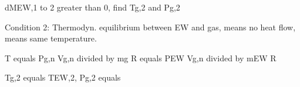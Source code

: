 dMEW,1 to 2 greater than 0, find Tg,2 and Pg,2

Condition 2: Thermodyn. equilibrium between EW and gas, means no heat flow, means same temperature.

T equals Pg,n Vg,n divided by mg R equals PEW Vg,n divided by mEW R

Tg,2 equals TEW,2, Pg,2 equals